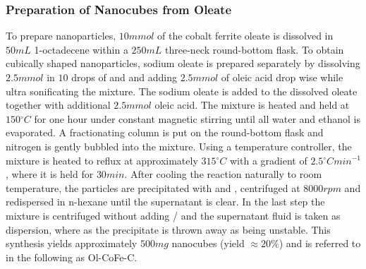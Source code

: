 \documentclass[\main/dresen_thesis.tex]{subfiles}
\begin{document}
    \subsubsection{Preparation of Nanocubes from Oleate}
      To prepare nanoparticles, $10 \unit{mmol}$ of the cobalt ferrite oleate is dissolved in $50 \unit{mL}$ 1-octadecene within a $250 \unit{mL}$ three-neck round-bottom flask.
      To obtain cubically shaped nanoparticles, sodium oleate is prepared separately by dissolving $2.5 \unit{mmol}$  in $10$ drops of  and  and adding $2.5 \unit{mmol}$ of oleic acid drop wise while ultra sonificating the mixture.
      The sodium oleate is added to the dissolved oleate together with additional $2.5 \unit{mmol}$ oleic acid.
      The mixture is heated and held at $150 \unit{^\circ C}$ for one hour under constant magnetic stirring until all water and ethanol is evaporated.
      A fractionating column is put on the round-bottom flask and nitrogen is gently bubbled into the mixture.
      Using a temperature controller, the mixture is heated to reflux at approximately $315 \unit{^\circ C}$ with a gradient of $2.5 \unit{^\circ C min^{-1}}$, where it is held for $30 \unit{min}$.
      After cooling the reaction naturally to room temperature, the particles are precipitated with  and , centrifuged at $8000 \unit{rpm}$ and redispersed in n-hexane until the supernatant is clear.
      In the last step the mixture is centrifuged without adding / and the supernatant fluid is taken as dispersion, where as the precipitate is thrown away as being unstable.
      This synthesis yields approximately $500 \unit{mg}$ nanocubes (yield $\approx 20 \%$) and is referred to in the following as Ol-CoFe-C.
\end{document}
